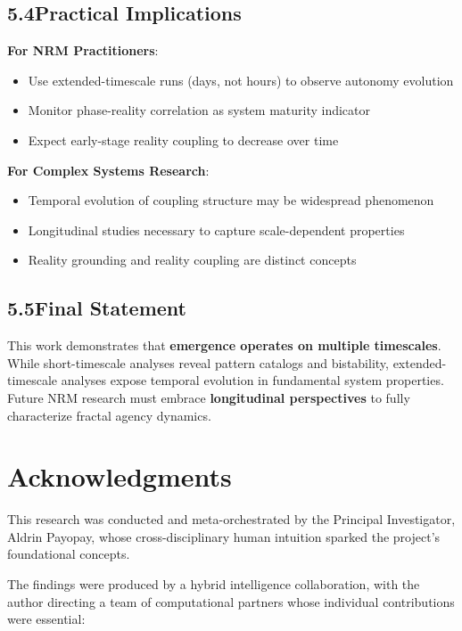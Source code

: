 \documentclass[11pt]{article}
\begin{document}
\subsection*{5.4\quad Practical Implications}

\noindent\textbf{For NRM Practitioners}:
\begin{itemize}
    \item Use extended-timescale runs (days, not hours) to observe autonomy evolution
    \item Monitor phase-reality correlation as system maturity indicator
    \item Expect early-stage reality coupling to decrease over time
\end{itemize}

\noindent\textbf{For Complex Systems Research}:
\begin{itemize}
    \item Temporal evolution of coupling structure may be widespread phenomenon
    \item Longitudinal studies necessary to capture scale-dependent properties
    \item Reality grounding and reality coupling are distinct concepts
\end{itemize}

\subsection*{5.5\quad Final Statement}

This work demonstrates that \textbf{emergence operates on multiple timescales}. While short-timescale analyses reveal pattern catalogs and bistability, extended-timescale analyses expose temporal evolution in fundamental system properties. Future NRM research must embrace \textbf{longitudinal perspectives} to fully characterize fractal agency dynamics.

\section*{Acknowledgments}

This research was conducted and meta-orchestrated by the Principal Investigator, Aldrin Payopay, whose cross-disciplinary human intuition sparked the project's foundational concepts.

The findings were produced by a hybrid intelligence collaboration, with the author directing a team of computational partners whose individual contributions were essential:
\end{document}
